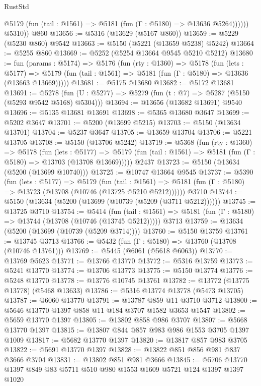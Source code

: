 \begin{lexlean}{RustStd}
\begin{coremodule}
              @5179 (fun (tail : @1561) => @5181 (fun (Γ : @5180) => @13636 @5264))))))
        @5310))
    @860
@13656 := @5316 (@13629 (@5167 @860))
@13659 := @5229 (@5230 @860) @9542
@13663 := @5150 (@5221 (@13659 @5238) @5242)
@13664 := @5255 @860
@13669 := @5252 (@5254 @13664 @9545 @5210 @5212)
@13680 := fun (params : @5174) =>
  @5176
    (fun (rty : @1360) =>
    @5178
      (fun (lets : @5177) =>
      @5179 (fun (tail : @1561) => @5181 (fun (Γ : @5180) => @13636 (@13663 @13669)))))
@13681 := @5175 @13680
@13682 := @5172 @13681
@13691 := @5278 (fun (U : @5277) => @5279 (fun (t : @7) => @5287 (@5150 (@5293 @9542 @5168) @5304)))
@13694 := @13656 (@13682 @13691) @9540
@13696 := @5135 @13681 @13691
@13698 := @5365 @13680 @3647
@13699 := @5202 @3647
@13701 := @5200 (@13699 @5215)
@13703 := @5150 (@13634 @13701)
@13704 := @5237 @3647
@13705 := @13659 @13704
@13706 := @5221 @13705
@13708 := @5150 (@13706 @5242)
@13719 := @5368
    (fun (rty : @1360) =>
    @5178
      (fun (lets : @5177) =>
      @5179 (fun (tail : @1561) => @5181 (fun (Γ : @5180) => @13703 (@13708 @13669)))))
    @2437
@13723 := @5150 (@13634 (@5200 (@13699 @10740)))
@13725 := @10747 @13664 @9545
@13737 := @5390
    (fun (lets : @5177) =>
    @5179
      (fun (tail : @1561) =>
      @5181 (fun (Γ : @5180) => @13723 (@13708 (@10746 (@13725 @5210 @5212))))))
    @3710
@13744 := @5150 (@13634 (@5200 (@13699 (@10739 (@5209 (@3711 @5212))))))
@13745 := @13725 @3710
@13754 := @5414
    (fun (tail : @1561) => @5181 (fun (Γ : @5180) => @13744 (@13708 (@10746 (@13745 @5212)))))
    @3713
@13759 := @13634 (@5200 (@13699 (@10739 (@5209 @3714))))
@13760 := @5150 @13759
@13761 := @13745 @3713
@13766 := @5432 (fun (Γ : @5180) => @13760 (@13708 (@10746 @13761)))
@13769 := @5445 (@6061 (@5618 @6063))
@13770 := @13769 @5623
@13771 := @13766 @13770
@13772 := @5316 @13759
@13773 := @5241 @13770
@13774 := @13706 @13773
@13775 := @5150 @13774
@13776 := @5248 @13770
@13778 := @13776 @10745 @13761
@13782 := @13772 (@13775 @13778) (@5468 @13633)
@13786 := @5316 @13774 @13778 (@5473 @13705)
@13787 := @6060 @13770
@13791 := @13787 @859 @11 @3710 @3712
@13800 := @5646 @13770 @1397 @858 @11 @184 @3707 @1582 @3653 @1547
@13802 := @5659 @13770 @1397
@13805 := @13802 @858 @986 @3707
@13807 := @5668 @13770 @1397
@13815 := @13807 @844 @857 @983 @986 @1553 @3705 @1397 @1009
@13817 := @5682 @13770 @1397
@13820 := @13817 @857 @983 @3705
@13822 := @5691 @13770 @1397
@13828 := @13822 @851 @856 @981 @837 @3666 @3704
@13831 := @13802 @851 @981 @3666
@13845 := @5706 @13770 @1397 @849 @83 @5711 @510 @980 @1553 @1609 @5721 @124 @1397 @1397 @1020

\end{coremodule}
\end{lexlean}
